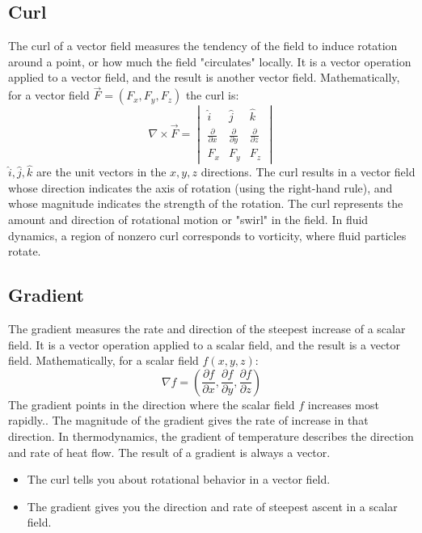 \subsection{Curl}
The curl of a vector field measures the tendency of the field to induce rotation around a point, or how much the field "circulates" locally. It is a vector operation applied to a vector field, and the result is another vector field. Mathematically, for a vector field $\vec{F}=(F_x, F_y, F_z)$ the curl is:
$$\nabla\times \vec{F}=\begin{vmatrix}
    \hat{i} & \hat{j} & \hat{k}\\
    \frac{\partial}{\partial x} &\frac{\partial}{\partial y} & \frac{\partial}{\partial z} \\
    F_x & F_y &F_z
\end{vmatrix}$$
$\hat{i}, \hat{j}, \hat{k}$ are the unit vectors in the $x,y,z$ directions.
The curl results in a vector field whose direction indicates the axis of rotation (using the right-hand rule), and whose magnitude indicates the strength of the rotation.  The curl represents the amount and direction of rotational motion or "swirl" in the field. In fluid dynamics, a region of nonzero curl corresponds to vorticity, where fluid particles rotate. 
\subsection{Gradient}
The gradient measures the rate and direction of the steepest increase of a scalar field. It is a vector operation applied to a scalar field, and the result is a vector field. Mathematically, for a scalar field $f(x,y,z)$:
$$\nabla f=\left(\frac{\partial f}{\partial x}, \frac{\partial f}{\partial y}, \frac{\partial f}{\partial z}\right)$$
The gradient points in the direction where the scalar field $f$ increases most rapidly.. The magnitude of the gradient gives the rate of increase in that direction. In thermodynamics, the gradient of temperature describes the direction and rate of heat flow. The result of a gradient is always a vector. 
\begin{itemize}
    \item The curl tells you about rotational behavior in a vector field.
    \item The gradient gives you the direction and rate of steepest ascent in a scalar field.
\end{itemize}
